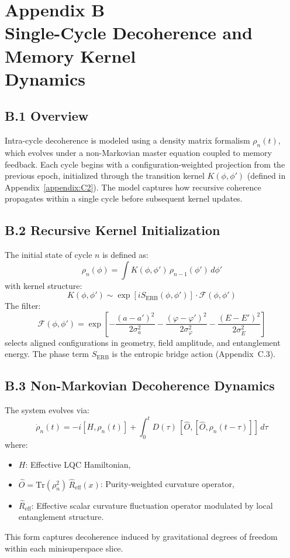 \section*{Appendix B\\Single-Cycle Decoherence and Memory Kernel\\Dynamics}
\label{appendix:B}

\subsection*{B.1 Overview}

Intra-cycle decoherence is modeled using a density matrix formalism \( \rho_n(t) \), which evolves under a non-Markovian master equation coupled to memory feedback. Each cycle begins with a configuration-weighted projection from the previous epoch, initialized through the transition kernel \( K(\phi, \phi') \) (defined in Appendix~\ref{appendix:C2}). The model captures how recursive coherence propagates within a single cycle before subsequent kernel updates.

\subsection*{B.2 Recursive Kernel Initialization}

The initial state of cycle \( n \) is defined as:
\[
\rho_n(\phi) = \int K(\phi, \phi') \, \rho_{n-1}(\phi') \, d\phi'
\]
with kernel structure:
\[
K(\phi, \phi') \sim \exp\left[i S_{\text{ERB}}(\phi, \phi')\right] \cdot \mathcal{F}(\phi, \phi')
\]
The filter:
\[
\mathcal{F}(\phi, \phi') = \exp\left[
-\frac{(a - a')^2}{2\sigma_a^2}
-\frac{(\varphi - \varphi')^2}{2\sigma_\varphi^2}
-\frac{(E - E')^2}{2\sigma_E^2}
\right]
\]
selects aligned configurations in geometry, field amplitude, and entanglement energy. The phase term \( S_{\text{ERB}} \) is the entropic bridge action (Appendix~C.3).

\subsection*{B.3 Non-Markovian Decoherence Dynamics}

The system evolves via:
\[
\dot{\rho}_n(t) = -i[H, \rho_n(t)] + \int_0^t D(\tau) \, [\hat{O}, [\hat{O}, \rho_n(t - \tau)]] \, d\tau
\]
where:
\begin{itemize}
    \item \( H \): Effective LQC Hamiltonian,
    \item \( \hat{O} = \mathrm{Tr}(\rho_n^2) \, \hat{R}_{\text{eff}}(x) \): Purity-weighted curvature operator,
    \item \( \hat{R}_{\text{eff}} \): Effective scalar curvature fluctuation operator modulated by local entanglement structure.
\end{itemize}
This form captures decoherence induced by gravitational degrees of freedom within each minisuperspace slice.

